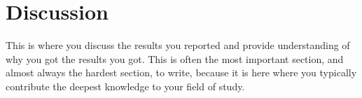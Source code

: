 \section{Discussion}\label{sec:discussion}

This is where you discuss the results you reported and provide understanding of why you got the results you got. This is often the most important section, and almost always the hardest section, to write, because it is here where you typically contribute the deepest knowledge to your field of study.